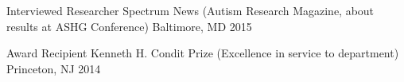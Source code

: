 

%

\begin{cvhonors}

  \cvhonor
    {Interviewed Researcher} %
    {Spectrum News (Autism Research Magazine, about results at ASHG Conference)} %
    {Baltimore, MD} %
    {2015} %

  \cvhonor
    {Award Recipient} %
    {Kenneth H. Condit Prize (Excellence in service to department)} %
    {Princeton, NJ} %
    {2014} %

\end{cvhonors}
